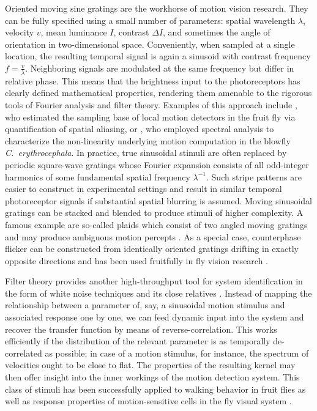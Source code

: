 Oriented moving sine gratings are the workhorse of motion vision research. They can be fully specified using a small number of parameters: spatial wavelength $\lambda$, velocity $v$, mean luminance $I$, contrast $\Delta I$, and sometimes the angle of orientation in two-dimensional space. Conveniently, when sampled at a single location, the resulting temporal signal is again a sinusoid with contrast frequency $f = \frac{v}{\lambda}$. Neighboring signals are modulated at the same frequency but differ in relative phase. This means that the brightness input to the photoreceptors has clearly defined mathematical properties, rendering them amenable to the rigorous tools of Fourier analysis and filter theory. Examples of this approach include \citet{Gotz:1964bj}, who estimated the sampling base of local motion detectors in the fruit fly via quantification of spatial aliasing, or \citet{Egelhaaf:1989wf}, who employed spectral analysis to characterize the non-linearity underlying motion computation in the blowfly \textit{C.\ erythrocephala}. In practice, true sinusoidal stimuli are often replaced by periodic square-wave gratings whose Fourier expansion consists of all odd-integer harmonics of some fundamental spatial frequency $\lambda^{-1}$. Such stripe patterns are easier to construct in experimental settings and result in similar temporal photoreceptor signals if substantial spatial blurring is assumed. Moving sinusoidal gratings can be stacked and blended to produce stimuli of higher complexity. A famous example are so-called plaids which consist of two angled moving gratings and may produce ambiguous motion percepts \citep{Adelson:1982aa}. As a special case, counterphase flicker can be constructed from identically oriented gratings drifting in exactly opposite directions and has been used fruitfully in fly vision research \citep{Bahl:2015cqa}.

Filter theory provides another high-throughput tool for system identification in the form of white noise techniques and its close relatives \citep{Dayan:2001aa}. Instead of mapping the relationship between a parameter of, say, a sinusoidal motion stimulus and associated response one by one, we can feed dynamic input into the system and recover the transfer function by means of reverse-correlation. This works efficiently if the distribution of the relevant parameter is as temporally de-correlated as possible; in case of a motion stimulus, for instance, the spectrum of velocities ought to be close to flat. The properties of the resulting kernel may then offer insight into the inner workings of the motion detection system. This class of stimuli has been successfully applied to walking behavior in fruit flies \citep{Theobald:2010dt,Aptekar:2013iv} as well as response properties of motion-sensitive cells in the fly visual system \citep{Weber:2010ic,Borst:2005dr}.

